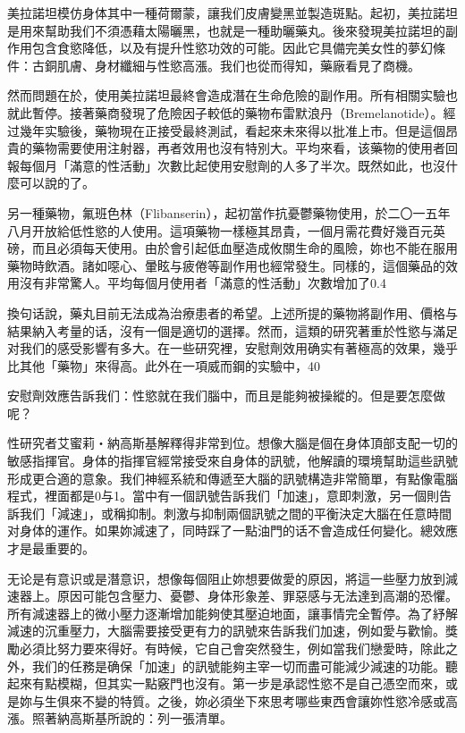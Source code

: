 \documentclass[12pt,UTF8]{ctexbook}
\begin{document}
美拉諾坦模仿身体其中一種荷爾蒙，讓我们皮膚變黑並製造斑點。起初，美拉諾坦是用來幫助我们不須憑藉太陽曬黑，也就是一種助曬藥丸。後來發現美拉諾坦的副作用包含食慾降低，以及有提升性慾功效的可能。因此它具備完美女性的夢幻條件：古銅肌膚、身材纖細与性慾高漲。我们也從而得知，藥廠看見了商機。

然而問題在於，使用美拉諾坦最終會造成潛在生命危險的副作用。所有相關实驗也就此暫停。接著藥商發現了危險因子較低的藥物布雷默浪丹（Bremelanotide）。經过幾年实驗後，藥物現在正接受最終測試，看起來未來得以批准上市。但是這個昂貴的藥物需要使用注射器，再者效用也沒有特別大。平均來看，该藥物的使用者回報每個月「滿意的性活動」次數比起使用安慰劑的人多了半次。既然如此，也沒什麼可以說的了。

另一種藥物，氟班色林（Flibanserin），起初當作抗憂鬱藥物使用，於二〇一五年八月开放給低性慾的人使用。這項藥物一樣極其昂貴，一個月需花費好幾百元英磅，而且必須每天使用。由於會引起低血壓造成攸關生命的風險，妳也不能在服用藥物時飲酒。諸如噁心、暈眩与疲倦等副作用也經常發生。同樣的，這個藥品的效用沒有非常驚人。平均每個月使用者「滿意的性活動」次數增加了0.4%

換句话說，藥丸目前无法成為治療患者的希望。上述所提的藥物將副作用、價格与結果納入考量的话，沒有一個是適切的選擇。然而，這類的研究著重於性慾与滿足对我们的感受影響有多大。在一些研究裡，安慰劑效用确实有著極高的效果，幾乎比其他「藥物」來得高。此外在一項威而鋼的实驗中，40%

安慰劑效應告訴我们：性慾就在我们腦中，而且是能夠被操縱的。但是要怎麼做呢？

性研究者艾蜜莉‧納高斯基解釋得非常到位。想像大腦是個在身体頂部支配一切的敏感指揮官。身体的指揮官經常接受來自身体的訊號，他解讀的環境幫助這些訊號形成更合適的意象。我们神經系統和傳遞至大腦的訊號構造非常簡單，有點像電腦程式，裡面都是0与1。當中有一個訊號告訴我们「加速」，意即刺激，另一個則告訴我们「減速」，或稱抑制。刺激与抑制兩個訊號之間的平衡決定大腦在任意時間对身体的運作。如果妳減速了，同時踩了一點油門的话不會造成任何變化。總效應才是最重要的。

无论是有意识或是潛意识，想像每個阻止妳想要做愛的原因，將這一些壓力放到減速器上。原因可能包含壓力、憂鬱、身体形象差、罪惡感与无法達到高潮的恐懼。所有減速器上的微小壓力逐漸增加能夠使其壓迫地面，讓事情完全暫停。為了紓解減速的沉重壓力，大腦需要接受更有力的訊號來告訴我们加速，例如愛与歡愉。獎勵必須比努力要來得好。有時候，它自己會突然發生，例如當我们戀愛時，除此之外，我们的任務是确保「加速」的訊號能夠主宰一切而盡可能減少減速的功能。聽起來有點模糊，但其实一點竅門也沒有。第一步是承認性慾不是自己憑空而來，或是妳与生俱來不變的特質。之後，妳必須坐下來思考哪些東西會讓妳性慾冷感或高漲。照著納高斯基所說的：列一張清單。
\end{document}

